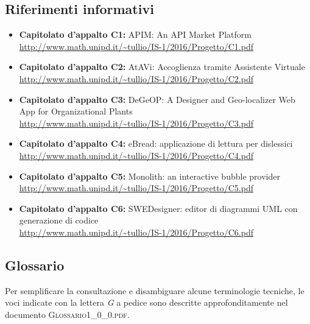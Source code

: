 \subsection{Riferimenti informativi}
\begin{itemize}
	\item \textbf{Capitolato d'appalto C1:} APIM: An API Market Platform \\ \url{http://www.math.unipd.it/~tullio/IS-1/2016/Progetto/C1.pdf}
	\item \textbf{Capitolato d'appalto C2:} AtAVi: Accoglienza tramite Assistente Virtuale \\ \url{http://www.math.unipd.it/~tullio/IS-1/2016/Progetto/C2.pdf}
	\item \textbf{Capitolato d'appalto C3:} DeGeOP: A Designer and Geo-localizer Web App for Organizational Plants \\
	\url{http://www.math.unipd.it/~tullio/IS-1/2016/Progetto/C3.pdf}
	\item \textbf{Capitolato d'appalto C4:} eBread: applicazione di lettura per dislessici \\
	\url{http://www.math.unipd.it/~tullio/IS-1/2016/Progetto/C4.pdf}
	\item \textbf{Capitolato d'appalto C5:} Monolith: an interactive bubble provider \\
	\url{http://www.math.unipd.it/~tullio/IS-1/2016/Progetto/C5.pdf}
	\item \textbf{Capitolato d'appalto C6:} SWEDesigner: editor di diagrammi UML con generazione di codice \\
	\url{http://www.math.unipd.it/~tullio/IS-1/2016/Progetto/C6.pdf}
\end{itemize}

\subsection{Glossario}
Per semplificare la consultazione e disambiguare alcune terminologie tecniche, le voci indicate con la lettera \textit{G} a pedice sono descritte approfonditamente nel documento \textsc{Glossario1\_0\_0.pdf}.
